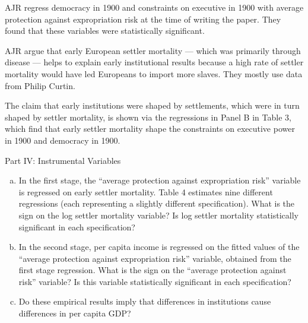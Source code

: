 \documentclass[8pt]{extarticle}
\begin{document}
  \begin{solution}
    \begin{tcolorbox}[colback = white, title = (a)]
      AJR regress democracy in 1900 and constraints on executive in 1900 with average protection against expropriation risk at the time of writing the paper. They found that these variables were statistically significant.
    \end{tcolorbox}
    \begin{tcolorbox}[colback = white, title = (b)]
      AJR argue that early European settler mortality --- which was primarily through disease --- helps to explain early institutional results because a high rate of settler mortality would have led Europeans to import more slaves. They mostly use data from Philip Curtin.
    \end{tcolorbox}
    \begin{tcolorbox}[colback = white, title = (c)]
      The claim that early institutions were shaped by settlements, which were in turn shaped by settler mortality, is shown via the regressions in Panel B in Table 3, which find that early settler mortality shape the constraints on executive power in 1900 and democracy in 1900.
    \end{tcolorbox}
  \end{solution}
  \begin{problem}{Part IV: Instrumental Variables}
    \begin{enumerate}[(a)]
      \item In the first stage, the ``average protection against expropriation risk'' variable is regressed on early settler mortality. Table 4 estimates nine different regressions (each representing a slightly different specification). What is the sign on the log settler mortality variable? Is log settler mortality statistically significant in each specification?
      \item In the second stage, per capita income is regressed on the fitted values of the ``average protection against expropriation risk'' variable, obtained from the first stage regression. What is the sign on the ``average protection against risk'' variable? Is this variable statistically significant in each specification?
      \item Do these empirical results imply that differences in institutions cause differences in per capita GDP?
    \end{enumerate}
  \end{problem}
\end{document}
